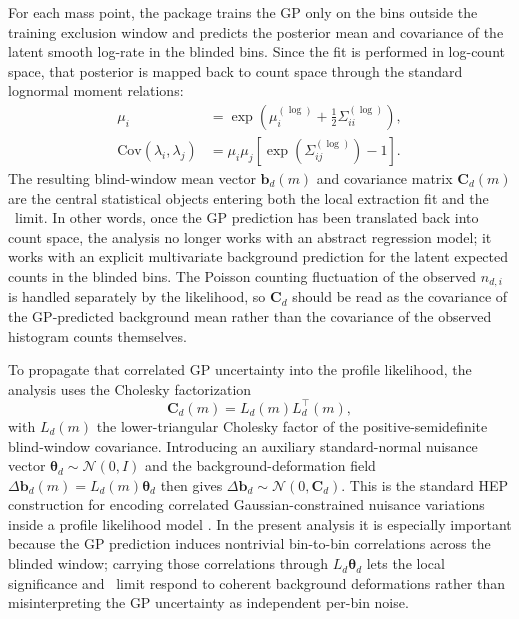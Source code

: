 For each mass point, the package trains the GP only on the bins outside the training
exclusion window and predicts the posterior mean and covariance of the latent smooth
log-rate in the blinded bins. Since the fit is performed in log-count space, that
posterior is mapped back to count space through the standard lognormal moment
relations:
\begin{align}
\mu_i &= \exp\!\left(\mu^{(\log)}_i + \frac{1}{2}\Sigma^{(\log)}_{ii}\right), \\
\mathrm{Cov}(\lambda_i,\lambda_j)
&= \mu_i\mu_j\left[\exp\!\left(\Sigma^{(\log)}_{ij}\right)-1\right].
\end{align}
The resulting blind-window mean vector $\bm{b}_d(m)$ and covariance matrix
$\bm{C}_d(m)$ are the central statistical objects entering both the local extraction
fit and the \CLs\ limit. In other words, once the GP prediction has been translated
back into count space, the analysis no longer works with an abstract regression model;
it works with an explicit multivariate background prediction for the latent expected
counts in the blinded bins. The Poisson counting fluctuation of the observed
$n_{d,i}$ is handled separately by the likelihood, so $\bm{C}_d$ should be read as the
covariance of the GP-predicted background mean rather than the covariance of the
observed histogram counts themselves.

To propagate that correlated GP uncertainty into the profile likelihood, the analysis
uses the Cholesky factorization
\begin{equation}
\bm{C}_d(m)=L_d(m)L_d^\top(m),
\label{eq:Cd-cholesky}
\end{equation}
with $L_d(m)$ the lower-triangular Cholesky factor of the positive-semidefinite
blind-window covariance. Introducing an auxiliary standard-normal nuisance vector
$\bm{\theta}_d\sim\mathcal{N}(0,I)$ and the background-deformation field
$\Delta\bm{b}_d(m)=L_d(m)\bm{\theta}_d$ then gives
$\Delta\bm{b}_d\sim\mathcal{N}(0,\bm{C}_d)$. This is the standard HEP construction for
encoding correlated Gaussian-constrained nuisance variations inside a profile
likelihood model \cite{HistFactory,Cowan2011}. In the present analysis it is
especially important because the GP prediction induces nontrivial bin-to-bin
correlations across the blinded window; carrying those correlations through
$L_d\bm{\theta}_d$ lets the local significance and \CLs\ limit respond to coherent
background deformations rather than misinterpreting the GP uncertainty as independent
per-bin noise.

